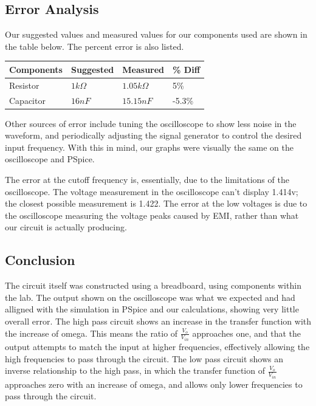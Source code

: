 \documentclass[11pt]{article}
\begin{document}
	\subsection*{Error Analysis}
	Our suggested values and measured values for our components used are shown in the table below. The percent error is also listed.
		\begin{table}[H]
		\def\arraystretch{1.2}%
		\centering
		\begin{tabular}{|l|l|l|l|}
			\hline
			Components       	& Suggested 		& Measured      	&\% Diff	\\ \hline
			Resistor  	    	& $1 k\Omega$		& $1.05 k\Omega$   & 5\%	     \\ \hline	
			Capacitor			& $16 n F$			& $15.15 nF$		& -5.3\%		\\ \hline
		\end{tabular}
	\end{table}

	Other sources of error include tuning the oscilloscope to show less noise in the waveform, and periodically adjusting the signal generator to control the desired input frequency. With this in mind, our graphs were visually the same on the oscilloscope and PSpice.
	
	The error at the cutoff frequency is, essentially, due to the limitations of the oscilloscope. The voltage measurement in the oscilloscope can't display 1.414v; the closest possible measurement is 1.422. The error at the low voltages is due to the oscilloscope measuring the voltage peaks caused by EMI, rather than what our circuit is actually producing.
	\subsection*{Conclusion}
	The circuit itself was constructed using a breadboard, using components within the lab. The output shown on the oscilloscope was what we expected and had alligned with the simulation in PSpice and our calculations, showing very little overall error. 
	The high pass circuit shows an increase in the transfer function with the increase of omega. This means the ratio of $\frac{V_{o}}{V_{in}}$ approaches one, and that the output attempts to match the input at higher frequencies, effectively allowing the high frequencies to pass through the circuit. 
	The low pass circuit shows an inverse relationship to the high pass, in which the transfer function of $\frac{V_{o}}{V_{in}}$ approaches zero with an increase of omega, and allows only lower frequencies to pass through the circuit. 
	\newpage
\end{document}
